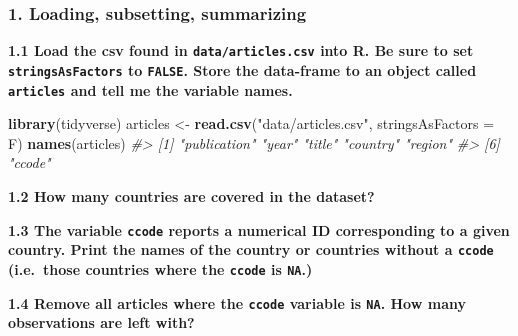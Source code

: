\documentclass[]{book}
\newenvironment{Shaded}{\begin{snugshade}}{\end{snugshade}}
\newcommand{\CommentTok}[1]{\textcolor[rgb]{0.56,0.35,0.01}{\textit{#1}}}
\newcommand{\DataTypeTok}[1]{\textcolor[rgb]{0.13,0.29,0.53}{#1}}
\newcommand{\KeywordTok}[1]{\textcolor[rgb]{0.13,0.29,0.53}{\textbf{#1}}}
\newcommand{\NormalTok}[1]{#1}
\newcommand{\OperatorTok}[1]{\textcolor[rgb]{0.81,0.36,0.00}{\textbf{#1}}}
\newcommand{\StringTok}[1]{\textcolor[rgb]{0.31,0.60,0.02}{#1}}
\begin{document}
\hypertarget{loading-subsetting-summarizing}{%
\subsubsection*{1. Loading, subsetting, summarizing}\label{loading-subsetting-summarizing}}

\textbf{1.1 Load the csv found in \texttt{data/articles.csv} into R. Be sure to set \texttt{stringsAsFactors} to \texttt{FALSE}. Store the data-frame to an object called \texttt{articles} and tell me the variable names.}

\begin{Shaded}
\begin{Highlighting}[]
\KeywordTok{library}\NormalTok{(tidyverse)}
\NormalTok{articles <-}\StringTok{ }\KeywordTok{read.csv}\NormalTok{(}\StringTok{"data/articles.csv"}\NormalTok{, }\DataTypeTok{stringsAsFactors =}\NormalTok{ F)}
\KeywordTok{names}\NormalTok{(articles)}
\CommentTok{#> [1] "publication" "year"        "title"       "country"     "region"     }
\CommentTok{#> [6] "ccode"}
\end{Highlighting}
\end{Shaded}

\textbf{1.2 How many countries are covered in the dataset?}

\begin{Shaded}
\end{Shaded}

\textbf{1.3 The variable \texttt{ccode} reports a numerical ID corresponding to a given country. Print the names of the country or countries without a \texttt{ccode} (i.e.~those countries where the \texttt{ccode} is \texttt{NA}.)}

\begin{Shaded}
\end{Shaded}

\textbf{1.4 Remove all articles where the \texttt{ccode} variable is \texttt{NA}. How many observations are left with?}
\end{document}
